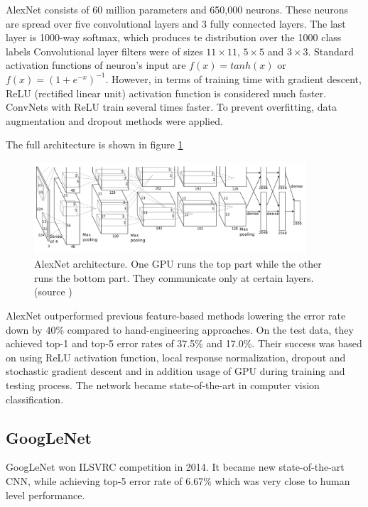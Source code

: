 AlexNet consists of 60 million parameters and 650,000 neurons. These neurons
are spread over five convolutional layers and 3 fully connected layers. The
last layer is 1000-way softmax, which produces te distribution over the 1000 class
labels
Convolutional layer filters were of sizes $11\times11$, $5\times5$ and $3\times3$.
Standard activation functions of neuron's input are $f(x) = tanh(x)$ or
$f(x)=(1+e^{-x})^{-1}$. However, in terms of training time with gradient descent,
ReLU (rectified linear unit) activation function is considered much faster. ConvNets
with ReLU train several times faster. To prevent overfitting, data augmentation
and dropout methods were applied.

The full architecture is shown in figure \ref{img:alexnet_architecture}

\begin{figure}[h]
	\centerline{\includegraphics[width=0.9\textwidth]{images/alexnet_architecture.png}}
	\caption[AlexNet architecture]{AlexNet architecture. One GPU runs the
		top part while the other runs the bottom part. They communicate only at
		certain layers. (source \cite{bib:krizhevsky2012imagenet})}
	\label{img:alexnet_architecture}
\end{figure}

AlexNet outperformed previous feature-based methods lowering the error rate down by
40\% compared to hand-engineering approaches. On the test data, they achieved top-1 and
top-5 error rates of 37.5\% and 17.0\%.
Their success was based on using ReLU activation function, local response normalization,
dropout and stochastic gradient descent and in addition usage of GPU during training
and testing process. The network became state-of-the-art in computer vision
classification.

\subsection{GoogLeNet}
\label{sec:cnn_rw:googlenet}

GoogLeNet \cite{bib:szegedy2015going} won ILSVRC competition in 2014. It became new
state-of-the-art CNN, while achieving top-5 error rate of 6.67\% which
was very close to human level performance.

